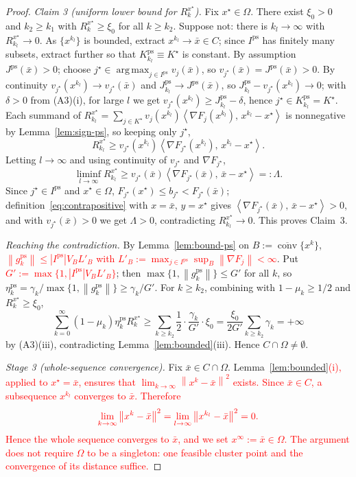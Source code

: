 \documentclass[]{interact}
\theoremstyle{plain}
\theoremstyle{definition}
\theoremstyle{remark}
\newcommand{\norm}[1]{\left\lVert #1 \right\rVert}
\newcommand{\abs}[1]{\left\lvert #1 \right\rvert}
\newcommand{\inner}[2]{\left\langle #1,\, #2 \right\rangle}
\DeclareMathOperator*{\argmax}{arg\,max}
\DeclareMathOperator{\conv}{conv}
\newcommand{\ps}{\mathrm{ps}}
\begin{document}
\begin{proof}
\smallskip
\emph{Claim 3 (uniform lower bound for $R^{x^\star}_k$).} Fix $x^\star\in\Omega$. There
exist $\xi_0>0$ and $k_2\ge k_1$ with $R^{x^\star}_k\ge\xi_0$ for all $k\ge k_2$. Suppose
not: there is $k_l\to\infty$ with $R^{x^\star}_{k_l}\to0$. As $\{x^{k_l}\}$ is bounded,
extract $x^{k_l}\to\bar x\in C$; since $I^{\ps}$ has finitely many subsets, extract
further so that $K^{\ps}_{k_l}\equiv K^\star$ is constant. By assumption
$J^{\ps}(\bar x)>0$; choose $j^\star\in\argmax_{j\in I^{\ps}}v_j(\bar x)$, so
$v_{j^\star}(\bar x)=J^{\ps}(\bar x)>0$. By continuity $v_{j^\star}(x^{k_l})\to
v_{j^\star}(\bar x)$ and $J^{\ps}_{k_l}\to J^{\ps}(\bar x)$, so
$J^{\ps}_{k_l}-v_{j^\star}(x^{k_l})\to0$; with $\delta>0$ from (A3)(i), for large $l$ we
get $v_{j^\star}(x^{k_l})\ge J^{\ps}_{k_l}-\delta$, hence $j^\star\in K^{\ps}_{k_l}=K^\star$.
Each summand of
$R^{x^\star}_{k_l}=\sum_{j\in K^\star}v_j(x^{k_l})\inner{\nabla F_j(x^{k_l})}{x^{k_l}-x^\star}$
is nonnegative by Lemma~\ref{lem:sign-ps}, so keeping only $j^\star$,
\[
R^{x^\star}_{k_l}\ge v_{j^\star}(x^{k_l})\inner{\nabla F_{j^\star}(x^{k_l})}{x^{k_l}-x^\star}.
\]
Letting $l\to\infty$ and using continuity of $v_{j^\star}$ and $\nabla F_{j^\star}$,
\[
\liminf_{l\to\infty}R^{x^\star}_{k_l}\ge v_{j^\star}(\bar x)\inner{\nabla F_{j^\star}(\bar x)}{\bar x-x^\star}=:\Lambda .
\]
Since $j^\star\in I^{\ps}$ and $x^\star\in\Omega$, $F_{j^\star}(x^\star)\le b_{j^\star}<F_{j^\star}(\bar x)$;
definition~\eqref{eq:contrapositive} with $x=\bar x$, $y=x^\star$ gives
$\inner{\nabla F_{j^\star}(\bar x)}{\bar x-x^\star}>0$, and with $v_{j^\star}(\bar x)>0$ we
get $\Lambda>0$, contradicting $R^{x^\star}_{k_l}\to0$. This proves Claim~3.

\smallskip
\emph{Reaching the contradiction.} By Lemma~\ref{lem:bound-ps} on
$B:=\overline{\conv}\{x^k\}$, \leavevmode\textcolor{red}{$\norm{g^{\ps}_k}\le\abs{I^{\ps}}V_B L'_B$ with
$L'_B:=\max_{j\in I^{\ps}}\sup_B\norm{\nabla F_j}<\infty$}. Put
\leavevmode\textcolor{red}{$G':=\max\{1,\abs{I^{\ps}}V_B L'_B\}$}; then $\max\{1,\norm{g^{\ps}_k}\}\le G'$ for all $k$,
so $\eta^{\ps}_k=\gamma_k/\max\{1,\norm{g^{\ps}_k}\}\ge\gamma_k/G'$. For $k\ge k_2$,
combining with $1-\mu_k\ge1/2$ and $R^{x^\star}_k\ge\xi_0$,
\[
\sum_{k=0}^\infty(1-\mu_k)\eta^{\ps}_k R^{x^\star}_k\ge\sum_{k\ge k_2}\frac12\cdot\frac{\gamma_k}{G'}\cdot\xi_0=\frac{\xi_0}{2G'}\sum_{k\ge k_2}\gamma_k=+\infty
\]
by (A3)(iii), contradicting Lemma~\ref{lem:bounded}(iii). Hence $C\cap\Omega\ne\emptyset$.

\emph{Stage 3 (whole-sequence convergence).} Fix $\bar x\in C\cap\Omega$.
Lemma~\leavevmode\textcolor{red}{\ref{lem:bounded}(i), applied to $x^\star=\bar x$, ensures that
$\lim_{k\to\infty}\norm{x^k-\bar x}^2$ exists. Since $\bar x\in C$, a subsequence
$x^{k_l}$ converges to $\bar x$. Therefore}
\[\textcolor{red}{
\lim_{k\to\infty}\norm{x^k-\bar x}^2
=\lim_{l\to\infty}\norm{x^{k_l}-\bar x}^2=0.
}\]
\leavevmode\textcolor{red}{Hence the whole sequence converges to $\bar x$, and we set $x^\infty:=\bar x\in\Omega$.
The argument does not require $\Omega$ to be a singleton: one feasible cluster point and
the convergence of its distance suffice.}
\end{proof}
\end{document}
